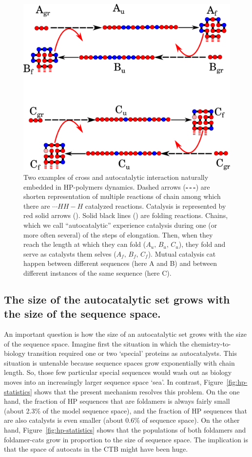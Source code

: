 \documentclass[5p,times]{elsarticle}
\newcommand*{\red}[1]{\textcolor{red}{#1}}
\begin{document}
\begin{figure}[h!]
  \centering
  \includegraphics[width=0.9\columnwidth]{pictures/catalysis-kinEx-all.pdf}
  \caption{\footnotesize{Two examples of cross and autocatalytic interaction naturally embedded in 
HP-polymers dynamics. Dashed arrows (\textbf{-\,-\,-}) are shorten representation of multiple 
reactions of chain among which there are $\cdots HH - H$ catalyzed reactions. Catalysis is 
represented by red solid arrows (\red{\textbf{\textemdash}}). Solid black lines 
(\textbf{\textemdash}) are folding reactions. Chains, which we call ``autocatalytic'' experience 
catalysis during one (or more often several) of the steps of elongation. Then, when they reach the 
length at which they can fold ($A_u,\, B_u,\, C_u$), they fold and serve as catalysts them selves 
($A_f,\, B_f,\, C_f$). Mutual catalysis cat happen between different sequences (here A and B) and 
between different instances of the same sequence (here C).}}
  \label{fig:kinExamples}
\end{figure}

\subsection{The size of the autocatalytic set grows with the size of the sequence space.}

 An important question is how the size of an autocatalytic set grows with the size of the sequence 
space.  Imagine first the situation in which the chemistry-to-biology transition required one or 
two `special' proteins as autocatalysts.  This situation is untenable because sequence spaces grow 
exponentially with chain length.  So, those few particular special sequences would wash out as 
biology moves into an increasingly larger sequence space `sea'.  In contrast, 
Figure~\ref{fig:hp-statistics} shows that the present mechanism resolves this problem.  On the one 
hand, the fraction of HP sequences that are foldamers is always fairly small (about 2.3\% of the 
model sequence space), and the fraction of HP sequences that are also catalysts is even smaller 
(about 0.6\% of sequence space).  On the other hand, Figure~\ref{fig:hp-statistics} shows that the 
populations of both foldamers and foldamer-cats grow in proportion to the size of sequence space.  
The implication is that the space of autocats in the CTB might have been huge.
\end{document}
